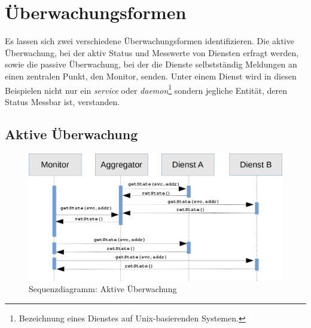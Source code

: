 \section{Überwachungsformen}

Es lassen sich zwei verschiedene Überwachungsformen identifizieren. Die aktive 
Überwachung, bei der aktiv Status und Messwerte von Diensten erfragt werden, sowie die 
passive Überwachung, bei der die Dienste selbstständig Meldungen an einen zentralen 
Punkt, den Monitor, senden. Unter einem Dienst wird in diesen Beispielen nicht nur ein 
\textit{service} oder \textit{daemon}\footnote{Bezeichnung eines Dienstes auf 
Unix-basierenden Systemen.} sondern jegliche Entität, deren Status Messbar ist, 
verstanden.

\subsection{Aktive Überwachung}
\begin{figure}[htbp]
    \caption{Sequenzdiagramm: Aktive Überwachung}
    \label{aktiv}\vspace{0.2cm}
    \centering
    \includegraphics[scale=0.36]{img/sequence_uml_active_trans}

\end{figure}


